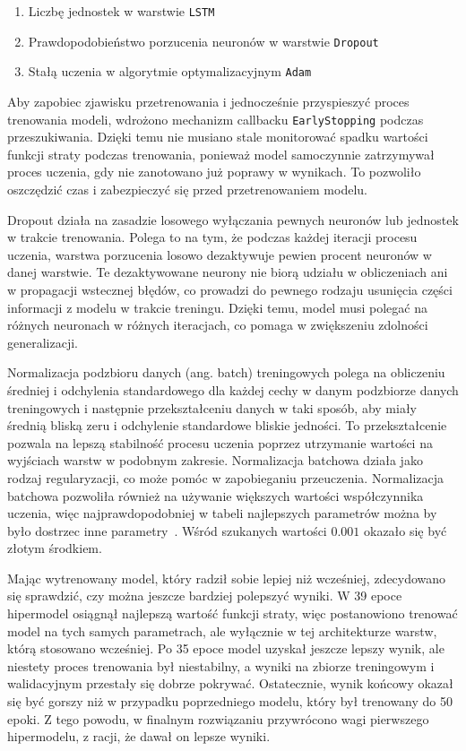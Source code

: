 \begin{enumerate}
    \item Liczbę jednostek w warstwie \texttt{LSTM}
    \item Prawdopodobieństwo porzucenia neuronów w warstwie \texttt{Dropout}
    \item Stałą uczenia w algorytmie optymalizacyjnym \texttt{Adam}
\end{enumerate}

Aby zapobiec zjawisku przetrenowania i jednocześnie przyspieszyć proces trenowania modeli, wdrożono mechanizm callbacku \texttt{EarlyStopping} podczas przeszukiwania. Dzięki temu nie musiano stale monitorować spadku wartości funkcji straty podczas trenowania, ponieważ model samoczynnie zatrzymywał proces uczenia, gdy nie zanotowano już poprawy w wynikach. To pozwoliło oszczędzić czas i zabezpieczyć się przed przetrenowaniem modelu.

Dropout działa na zasadzie losowego wyłączania pewnych neuronów lub jednostek w trakcie trenowania. Polega to na tym, że podczas każdej iteracji procesu uczenia, warstwa porzucenia losowo dezaktywuje pewien procent neuronów w danej warstwie. Te dezaktywowane neurony nie biorą udziału w obliczeniach ani w propagacji wstecznej błędów, co prowadzi do pewnego rodzaju usunięcia części informacji z modelu w trakcie treningu. Dzięki temu, model musi polegać na różnych neuronach w różnych iteracjach, co pomaga w zwiększeniu zdolności generalizacji.

Normalizacja podzbioru danych (ang. batch) treningowych polega na obliczeniu średniej i odchylenia standardowego dla każdej cechy w danym podzbiorze danych treningowych i następnie przekształceniu danych w taki sposób, aby miały średnią bliską zeru i odchylenie standardowe bliskie jedności. To przekształcenie pozwala na lepszą stabilność procesu uczenia poprzez utrzymanie wartości na wyjściach warstw w podobnym zakresie. Normalizacja batchowa działa jako rodzaj regularyzacji, co może pomóc w zapobieganiu przeuczenia. Normalizacja batchowa pozwoliła również na używanie większych wartości współczynnika uczenia, więc najprawdopodobniej w tabeli najlepszych parametrów można by było dostrzec inne parametry~\cite{ioffe2015}. Wśród szukanych wartości $0.001$ okazało się być złotym środkiem.

Mając wytrenowany model, który radził sobie lepiej niż wcześniej, zdecydowano się sprawdzić, czy można jeszcze bardziej polepszyć wyniki. W 39 epoce hipermodel osiągnął najlepszą wartość funkcji straty, więc postanowiono trenować model na tych samych parametrach, ale wyłącznie w tej architekturze warstw, którą stosowano wcześniej. Po 35 epoce model uzyskał jeszcze lepszy wynik, ale niestety proces trenowania był niestabilny, a wyniki na zbiorze treningowym i walidacyjnym przestały się dobrze pokrywać. Ostatecznie, wynik końcowy okazał się być gorszy niż w przypadku poprzedniego modelu, który był trenowany do 50 epoki. Z tego powodu, w finalnym rozwiązaniu przywrócono wagi pierwszego hipermodelu, z racji, że dawał on lepsze wyniki.

